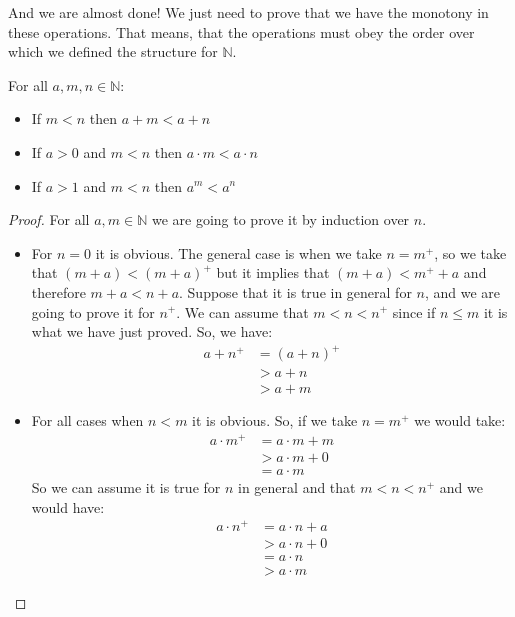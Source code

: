 \documentclass{tufte-handout}
\begin{document}
And we are almost done! We just need to prove that we have the monotony in these operations. That means, that the operations must obey the order over which we defined the structure for $\mathbb{N}$.

\begin{theorem}
	For all $a, m, n \in \mathbb{N}$:
	\begin{itemize}
		\item If $m < n$ then $a + m < a + n$
		\item If $a > 0$ and $m < n$ then $a \cdot m < a\cdot n$
		\item If $a > 1$ and $m < n$ then $a^m < a^n$
	\end{itemize}
\end{theorem}
\begin{proof}
	For all $a, m\in \mathbb{N}$ we are going to prove it by induction over $n$. 
	\begin{itemize}
		\item For $n = 0$ it is obvious. The general case is when we take $n = m^+$, so we take that $(m + a) < (m + a)^+$ but it implies that $(m + a) < m^+ + a$ and therefore $m + a < n + a$. Suppose that it is true in general for $n$, and we are going to prove it for $n^+$. We can assume that $m < n < n^+$ since if $n \le m$ it is what we have just proved. So, we have:
		\begin{align*}
			a + n^+ &= (a + n)^+\\
			&> a + n\\
			&> a + m
		\end{align*}

		\item For all cases when $n < m$ it is obvious. So, if we take $n = m^+$ we would take:
		\begin{align*}
			a \cdot m^+ &= a \cdot m + m\\
			&> a \cdot m + 0\\
			&= a \cdot m
		\end{align*}
		So we can assume it is true for $n$ in general and that $m < n < n^+$ and we would have:
		\begin{align*}
			a \cdot n^+ &= a \cdot n + a\\
			&> a \cdot n + 0\\
			&= a \cdot n\\
			&> a \cdot m
		\end{align*}


\end{itemize}
\end{proof}
\end{document}
